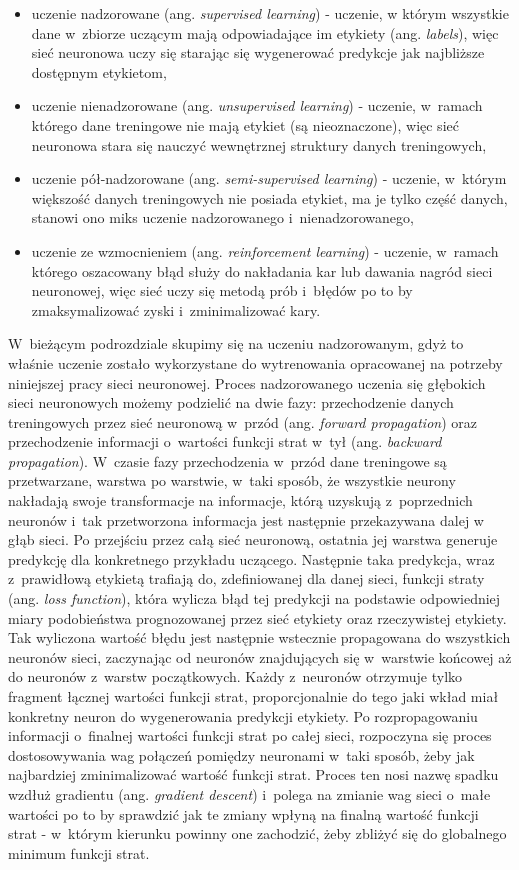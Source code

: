\begin{itemize}
\item uczenie nadzorowane (ang. \emph{supervised learning}) - uczenie, w którym wszystkie dane w~zbiorze uczącym mają odpowiadające im etykiety (ang. \emph{labels}), więc sieć neuronowa uczy się starając się wygenerować predykcje jak najbliższe dostępnym etykietom,
\item uczenie nienadzorowane (ang. \emph{unsupervised learning}) - uczenie, w~ramach którego dane treningowe nie mają etykiet (są nieoznaczone), więc sieć neuronowa stara się nauczyć wewnętrznej struktury danych treningowych,
\item uczenie pół-nadzorowane (ang. \emph{semi-supervised learning}) - uczenie, w~którym większość danych treningowych nie posiada etykiet, ma je tylko część danych, stanowi ono miks uczenie nadzorowanego i~nienadzorowanego,
\item uczenie ze wzmocnieniem (ang. \emph{reinforcement learning}) - uczenie, w~ramach którego oszacowany błąd służy do nakładania kar lub dawania nagród sieci neuronowej, więc sieć uczy się metodą prób i~błędów po to by zmaksymalizować zyski i~zminimalizować kary.
\end{itemize}

W~bieżącym podrozdziale skupimy się na uczeniu nadzorowanym, gdyż to właśnie uczenie zostało wykorzystane do wytrenowania opracowanej na potrzeby niniejszej pracy sieci neuronowej. Proces nadzorowanego uczenia się głębokich sieci neuronowych możemy podzielić na dwie fazy: przechodzenie danych treningowych przez sieć neuronową w~przód (ang. \emph{forward propagation}) oraz przechodzenie informacji o~wartości funkcji strat w~tył (ang. \emph{backward propagation}). W~czasie fazy przechodzenia w~przód dane treningowe są przetwarzane, warstwa po warstwie, w~taki sposób, że wszystkie neurony nakładają swoje transformacje na informacje, którą uzyskują z~poprzednich neuronów i~tak przetworzona informacja jest następnie przekazywana dalej w głąb sieci. Po przejściu przez całą sieć neuronową, ostatnia jej warstwa generuje predykcję dla konkretnego przykładu uczącego. Następnie taka predykcja, wraz z~prawidłową etykietą trafiają do, zdefiniowanej dla danej sieci, funkcji straty (ang. \emph{loss function}), która wylicza błąd tej predykcji na podstawie odpowiedniej miary podobieństwa prognozowanej przez sieć etykiety oraz rzeczywistej etykiety. Tak wyliczona wartość błędu jest następnie wstecznie propagowana do wszystkich neuronów sieci, zaczynając od neuronów znajdujących się w~warstwie końcowej aż do neuronów z~warstw początkowych. Każdy z~neuronów otrzymuje tylko fragment łącznej wartości funkcji strat, proporcjonalnie do tego jaki wkład miał konkretny neuron do wygenerowania predykcji etykiety. Po rozpropagowaniu informacji o~finalnej wartości funkcji strat po całej sieci, rozpoczyna się proces dostosowywania wag połączeń pomiędzy neuronami w~taki sposób, żeby jak najbardziej zminimalizować wartość funkcji strat. Proces ten nosi nazwę spadku wzdłuż gradientu (ang. \emph{gradient descent}) i~polega na zmianie wag sieci o~małe wartości po to by sprawdzić jak te zmiany wpłyną na finalną wartość funkcji strat - w~którym kierunku powinny one zachodzić, żeby zbliżyć się do globalnego minimum funkcji strat. 

